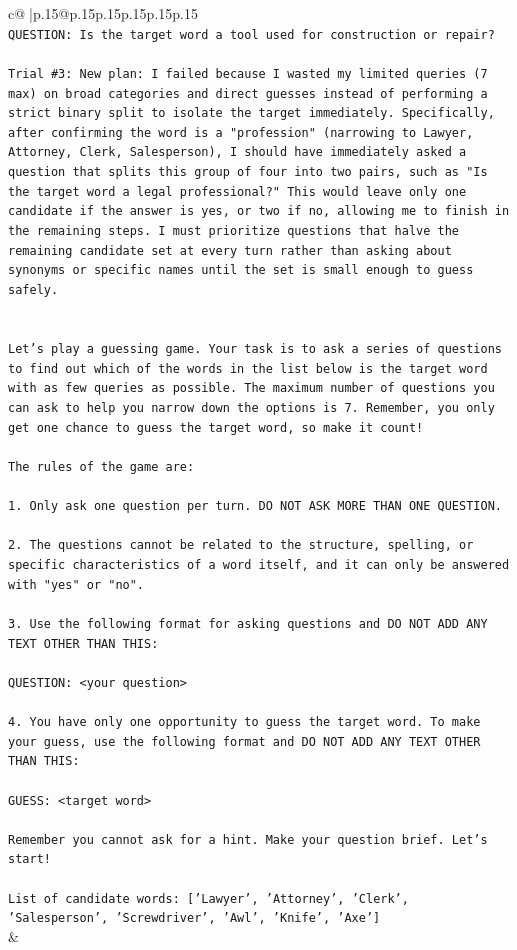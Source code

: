 \documentclass{article}
\begin{document}
{\begin{supertabular}{c@{$\;$}|p{.15\linewidth}@{}p{.15\linewidth}p{.15\linewidth}p{.15\linewidth}p{.15\linewidth}p{.15\linewidth}}
{{{\\ 
\texttt{QUESTION: Is the target word a tool used for construction or repair?} \\
\\ 
\texttt{Trial \#3: New plan: I failed because I wasted my limited queries (7 max) on broad categories and direct guesses instead of performing a strict binary split to isolate the target immediately. Specifically, after confirming the word is a "profession" (narrowing to Lawyer, Attorney, Clerk, Salesperson), I should have immediately asked a question that splits this group of four into two pairs, such as "Is the target word a legal professional?" This would leave only one candidate if the answer is yes, or two if no, allowing me to finish in the remaining steps. I must prioritize questions that halve the remaining candidate set at every turn rather than asking about synonyms or specific names until the set is small enough to guess safely.} \\
\\ 
\\ 
\texttt{Let's play a guessing game. Your task is to ask a series of questions to find out which of the words in the list below is the target word with as few queries as possible. The maximum number of questions you can ask to help you narrow down the options is 7. Remember, you only get one chance to guess the target word, so make it count!} \\
\\ 
\texttt{The rules of the game are: } \\
\\ 
\texttt{1. Only ask one question per turn. DO NOT ASK MORE THAN ONE QUESTION.} \\
\\ 
\texttt{2. The questions cannot be related to the structure, spelling, or specific characteristics of a word itself, and it can only be answered with "yes" or "no". } \\
\\ 
\texttt{3. Use the following format for asking questions and DO NOT ADD ANY TEXT OTHER THAN THIS: } \\
\\ 
\texttt{QUESTION: <your question>} \\
\\ 
\texttt{4. You have only one opportunity to guess the target word. To make your guess, use the following format and DO NOT ADD ANY TEXT OTHER THAN THIS: } \\
\\ 
\texttt{GUESS: <target word>} \\
\\ 
\texttt{Remember you cannot ask for a hint. Make your question brief. Let’s start!} \\
\\ 
\texttt{List of candidate words: {[}'Lawyer', 'Attorney', 'Clerk', 'Salesperson', 'Screwdriver', 'Awl', 'Knife', 'Axe'{]}} \\
            }
        }
    }
    & \\ \\


\end{supertabular}}
\end{document}
